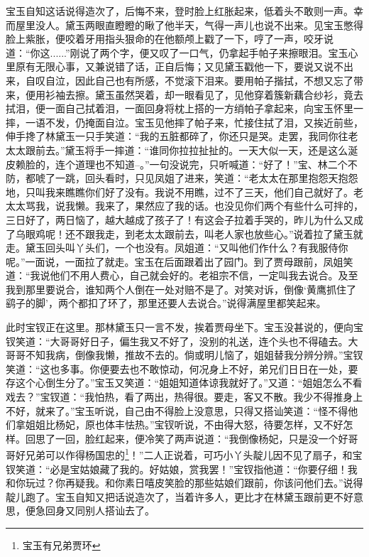 \documentclass[12pt,oneside]{book}
\begin{document}
宝玉自知这话说得造次了，后悔不来，登时脸上红胀起来，低着头不敢则一声。幸而屋里没人。黛玉两眼直瞪瞪的瞅了他半天，气得一声儿也说不出来。见宝玉憋得脸上紫胀，便咬着牙用指头狠命的在他额颅上戳了一下，哼了一声，咬牙说道：“你这......”刚说了两个字，便又叹了一口气，仍拿起手帕子来擦眼泪。宝玉心里原有无限心事，又兼说错了话，正自后悔；又见黛玉戳他一下，要说又说不出来，自叹自泣，因此自己也有所感，不觉滚下泪来。要用帕子揩拭，不想又忘了带来，便用衫袖去擦。黛玉虽然哭着，却一眼看见了，见他穿着簇新藕合纱衫，竟去拭泪，便一面自己拭着泪，一面回身将枕上搭的一方绡帕子拿起来，向宝玉怀里一摔，一语不发，仍掩面自泣。宝玉见他摔了帕子来，忙接住拭了泪，又挨近前些，伸手搀了林黛玉一只手笑道：“我的五脏都碎了，你还只是哭。走罢，我同你往老太太跟前去。”黛玉将手一摔道：“谁同你拉拉扯扯的。一天大似一天，还是这么涎皮赖脸的，连个道理也不知道--。”一句没说完，只听喊道：“好了！”宝、林二个不防，都唬了一跳，回头看时，只见凤姐了进来，笑道：“老太太在那里抱怨天抱怨地，只叫我来瞧瞧你们好了没有。我说不用瞧，过不了三天，他们自己就好了。老太太骂我，说我懒。我来了，果然应了我的话。也没见你们两个有些什么可拌的，三日好了，两日恼了，越大越成了孩子了！有这会子拉着手哭的，昨儿为什么又成了乌眼鸡呢！还不跟我走，到老太太跟前去，叫老人家也放些心。”说着拉了黛玉就走。黛玉回头叫丫头们，一个也没有。凤姐道：“又叫他们作什么？有我服侍你呢。”一面说，一面拉了就走。宝玉在后面跟着出了园门。到了贾母跟前，凤姐笑道：“我说他们不用人费心，自己就会好的。老祖宗不信，一定叫我去说合。及至我到那里要说合，谁知两个人倒在一处对赔不是了。对笑对诉，倒像‘黄鹰抓住了鹞子的脚’，两个都扣了环了，那里还要人去说合。”说得满屋里都笑起来。

此时宝钗正在这里。那林黛玉只一言不发，挨着贾母坐下。宝玉没甚说的，便向宝钗笑道：“大哥哥好日子，偏生我又不好了，没别的礼送，连个头也不得磕去。大哥哥不知我病，倒像我懒，推故不去的。倘或明儿恼了，姐姐替我分辨分辨。”宝钗笑道：“这也多事。你便要去也不敢惊动，何况身上不好，弟兄们日日在一处，要存这个心倒生分了。”宝玉又笑道：“姐姐知道体谅我就好了。”又道：“姐姐怎么不看戏去？”宝钗道：“我怕热，看了两出，热得很。要走，客又不散。我少不得推身上不好，就来了。”宝玉听说，自己由不得脸上没意思，只得又搭讪笑道：“怪不得他们拿姐姐比杨妃，原也体丰怯热。”宝钗听说，不由得大怒，待要怎样，又不好怎样。回思了一回，脸红起来，便冷笑了两声说道：“我倒像杨妃，只是没一个好哥哥好兄弟可以作得杨国忠的\footnote{宝玉有兄弟贾环}！”二人正说着，可巧小丫头靛儿因不见了扇子，和宝钗笑道：“必是宝姑娘藏了我的。好姑娘，赏我罢！”宝钗指他道：“你要仔细！我和你玩过？你再疑我。和你素日嘻皮笑脸的那些姑娘们跟前，你该问他们去。”说得靛儿跑了。宝玉自知又把话说造次了，当着许多人，更比才在林黛玉跟前更不好意思，便急回身又同别人搭讪去了。
\end{document}
